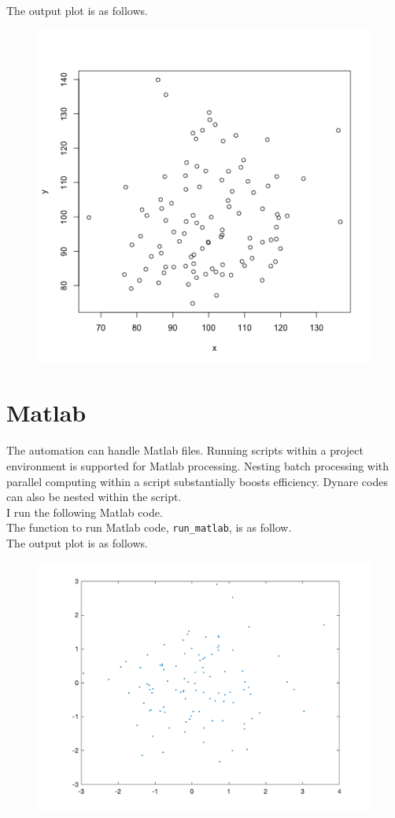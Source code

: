 \documentclass[12pt, a4paper]{article}
\begin{document}


The output plot is as follows.\\

\begin{figure}[H]
	\includegraphics[width=.5\textwidth]{sample_r_graph.png}
\end{figure}

\section{Matlab}

The automation can handle Matlab files. Running scripts within a project environment is supported for Matlab processing. Nesting batch processing with parallel computing within a script substantially boosts efficiency. Dynare codes can also be nested within the script.\\

I run the following Matlab code.\\



The function to run Matlab code, \texttt{run\_matlab}, is as follow.\\



The output plot is as follows.\\

\begin{figure}[H]
	\includegraphics[width=.5\textwidth]{sample_matlab_graph.png}
\end{figure}
\end{document}
